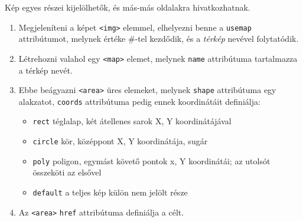 \begin{frame}
  Kép egyes részei kijelölhetők, és más-más oldalakra hivatkozhatnak.
  \begin{enumerate}
    \item Megjeleníteni a képet \texttt{<img>} elemmel, elhelyezni benne a \texttt{usemap} attribútumot, melynek értéke \#-tel kezdődik, és a \emph{térkép} nevével folytatódik.
    \item Létrehozni valahol egy \texttt{<map>} elemet, melynek \texttt{name} attribútuma tartalmazza a térkép nevét.
    \item Ebbe beágyazni \texttt{<area>} üres elemeket, melynek \texttt{shape} attribútuma egy alakzatot, \texttt{coords} attribútuma pedig ennek koordinátáit definiálja:
    \begin{itemize}
      \item \texttt{rect} téglalap, két átellenes sarok X, Y koordinátájával
      \item \texttt{circle} kör, középpont X, Y koordinátája, sugár
      \item \texttt{poly} poligon, egymást követő pontok x, Y koordinátái; az utolsót összeköti az elsővel
      \item \texttt{default} a teljes kép külön nem jelölt része
    \end{itemize}
    \item Az \texttt{<area>} \texttt{href} attribútuma definiálja a célt.
  \end{enumerate}
\end{frame}

